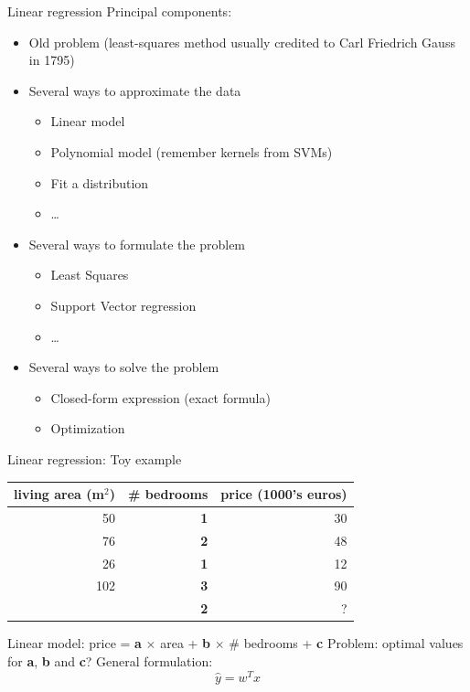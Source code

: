 \documentclass{beamer}
\begin{document}
\begin{frame}{Linear regression}
Principal components:
\begin{itemize}
	\item Old problem (least-squares method usually credited to Carl Friedrich Gauss in 1795)
	\pause
	\item Several ways to approximate the data
	\begin{itemize}
		\item Linear model
		\item Polynomial model (remember kernels from SVMs)
		\item Fit a distribution
		\item \ldots
	\end{itemize}
	\pause
	\item Several ways to formulate the problem
	\begin{itemize}
		\item Least Squares
		\item Support Vector regression
		\item \ldots
	\end{itemize}
	\pause
	\item Several ways to solve the problem
	\begin{itemize}
		\item Closed-form expression (exact formula)
		\item Optimization
	\end{itemize}
\end{itemize}
\end{frame}



\begin{frame}{Linear regression: Toy example}

\begin{table}
\centering
\begin{tabular}{r|r|r}
living area (m$^2$) &  \textbf{\# bedrooms} & price (1000's euros) \\\hline
50 & \textbf{1} & 30\\
76 & \textbf{2} & 48\\
26 & \textbf{1} & 12\\
102 & \textbf{3} & 90\\
\pause
61 & \textbf{2} & ?
\end{tabular}
\end{table}
\pause 

\vfill
Linear model: price = \textbf{a} $\times$ area + \textbf{b} $\times$ \# bedrooms + \textbf{c}
\pause
\vfill
Problem: optimal values for \textbf{a}, \textbf{b} and \textbf{c}?
\vfill
\pause
General formulation:
\begin{equation*}
	\hat{y} = w^T x
\end{equation*}

\end{frame}
\end{document}
